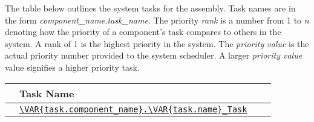 The table below outlines the system tasks for the  assembly. Task names are in the form \textit{component\_name.task\_name}. The priority \textit{rank} is a number from 1 to \textit{n} denoting how the priority of a component's task compares to others in the system. A rank of 1 is the highest priority in the system. The \textit{priority value} is the actual priority number provided to the system scheduler. A larger \textit{priority value} value signifies a higher priority task.

{\renewcommand{\arraystretch}{2.2} %
  \begin{xltabular}{\textwidth}{ | c | X | c | c | }
  \hline
   & \textbf{Task Name} &  &  \\ \hline
  \texttt{} &
  \texttt{\url{\VAR{task.component_name}.\VAR{task.name}_Task}} &
  \texttt{} &
  \texttt{}
  \\ \hline
\end{xltabular}}
\vspace{5mm} %
